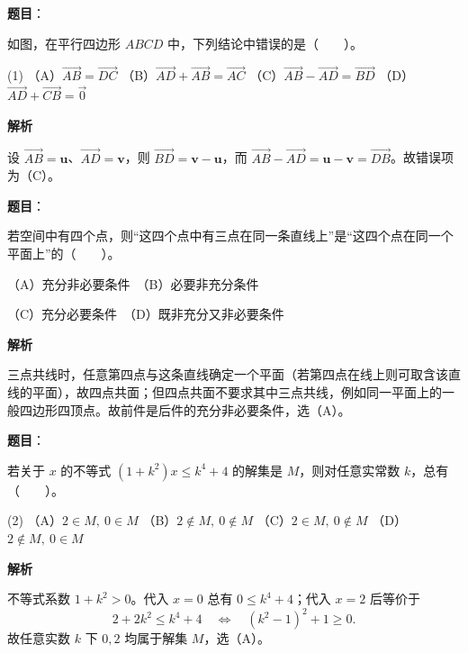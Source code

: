 \begin{answer}

\textbf{题目}：

如图，在平行四边形 $ABCD$ 中，下列结论中错误的是\mbox{（　　）}。

\begin{gkopts}(1)
\task （A）$\overrightarrow{AB}=\overrightarrow{DC}$
\task （B）$\overrightarrow{AD}+\overrightarrow{AB}=\overrightarrow{AC}$
\task （C）$\overrightarrow{AB}-\overrightarrow{AD}=\overrightarrow{BD}$
\task （D）$\overrightarrow{AD}+\overrightarrow{CB}=\vec 0$
\end{gkopts}
\nopagebreak[4]
\begin{center}\end{center}
\nopagebreak[4]
\textbf{解析}

设 $\overrightarrow{AB}=\mathbf u$、$\overrightarrow{AD}=\mathbf v$，则 $\overrightarrow{BD}=\mathbf v-\mathbf u$，而 $\overrightarrow{AB}-\overrightarrow{AD}=\mathbf u-\mathbf v=\overrightarrow{DB}$。故错误项为（C）。


\end{answer}
\begin{answer}

\textbf{题目}：

若空间中有四个点，则“这四个点中有三点在同一条直线上”是“这四个点在同一个平面上”的\mbox{（　　）}。

（A）充分非必要条件　（B）必要非充分条件

（C）充分必要条件　（D）既非充分又非必要条件

\textbf{解析}

三点共线时，任意第四点与这条直线确定一个平面（若第四点在线上则可取含该直线的平面），故四点共面；但四点共面不要求其中三点共线，例如同一平面上的一般四边形四顶点。故前件是后件的充分非必要条件，选（A）。


\end{answer}
\begin{answer}

\textbf{题目}：

若关于 $x$ 的不等式 $(1+k^2)x\le k^4+4$ 的解集是 $M$，则对任意实常数 $k$，总有\mbox{（　　）}。

\begin{gkopts}(2)
\task （A）$2\in M,\ 0\in M$
\task （B）$2\notin M,\ 0\notin M$
\task （C）$2\in M,\ 0\notin M$
\task （D）$2\notin M,\ 0\in M$
\end{gkopts}

\textbf{解析}

不等式系数 $1+k^2>0$。代入 $x=0$ 总有 $0\le k^4+4$；代入 $x=2$ 后等价于
\nopagebreak[4]
\[
2+2k^2\le k^4+4\quad\Longleftrightarrow\quad(k^2-1)^2+1\ge0.
\]
故任意实数 $k$ 下 $0,2$ 均属于解集 $M$，选（A）。


\end{answer}
